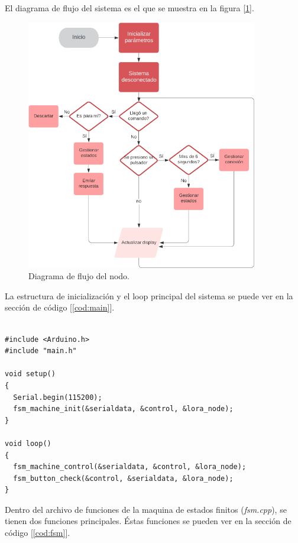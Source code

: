 El diagrama de flujo del sistema es el que se muestra en la figura [\ref{fig:diagramaflujo}].

\begin{figure}[h!]
	\centering
	\includegraphics[width=0.9\textwidth]{./Figures/diagramaflujo.png}
	\caption{Diagrama de flujo del nodo.}
	\label{fig:diagramaflujo}
\end{figure}

La estructura de inicialización y el loop principal del sistema se puede ver en la sección de código [\ref{cod:main}].

\begin{lstlisting}[label=cod:main,caption=Estructura principal de código. Archivo {\textit{main.cpp}} ]  % Start your code-block

#include <Arduino.h>
#include "main.h"

void setup()
{
  Serial.begin(115200);
  fsm_machine_init(&serialdata, &control, &lora_node);
}

void loop()
{
  fsm_machine_control(&serialdata, &control, &lora_node);
  fsm_button_check(&control, &serialdata, &lora_node);
}

\end{lstlisting}

Dentro del archivo de funciones de la maquina de estados finitos ({\textit{fsm.cpp}}), se tienen dos funciones principales. Éstas funciones se pueden ver en la sección de código [\ref{cod:fsm}].

